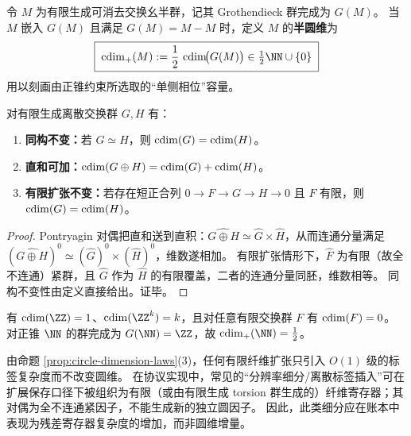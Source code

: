 \begin{definition}[半圆维]\label{def:half-circle-dimension}
令 \(M\) 为有限生成可消去交换幺半群，记其 Grothendieck 群完成为 \(G(M)\)。
当 \(M\) 嵌入 \(G(M)\) 且满足 \(G(M)=M-M\) 时，定义 \(M\) 的\textbf{半圆维}为
\[
\boxed{\;\cdim_{+}(M):=\frac12\,\cdim\!\bigl(G(M)\bigr)\in\tfrac12\NN\cup\{0\}\;}
\]
用以刻画由正锥约束所选取的“单侧相位”容量。
\end{definition}

\begin{proposition}[圆维的基本算律]\label{prop:circle-dimension-laws}
对有限生成离散交换群 \(G,H\) 有：
\begin{enumerate}
  \item \textbf{同构不变：}若 \(G\simeq H\)，则 \(\operatorname{cdim}(G)=\operatorname{cdim}(H)\)。
  \item \textbf{直和可加：}\(\operatorname{cdim}(G\oplus H)=\operatorname{cdim}(G)+\operatorname{cdim}(H)\)。
  \item \textbf{有限扩张不变：}若存在短正合列 \(0\to F\to G\to H\to 0\) 且 \(F\) 有限，则 \(\operatorname{cdim}(G)=\operatorname{cdim}(H)\)。
\end{enumerate}
\end{proposition}
\begin{proof}
Pontryagin 对偶把直和送到直积：\(\widehat{G\oplus H}\simeq \widehat G\times\widehat H\)，从而连通分量满足 \((\widehat{G\oplus H})^0\simeq (\widehat G)^0\times(\widehat H)^0\)，维数遂相加。
有限扩张情形下，\(\widehat F\) 为有限（故全不连通）紧群，且 \(\widehat G\) 作为 \(\widehat H\) 的有限覆盖，二者的连通分量同胚，维数相等。
同构不变性由定义直接给出。证毕。
\end{proof}

\begin{example}[基本例子]\label{ex:circle-dimension-examples}
有 \(\cdim(\ZZ)=1\)、\(\cdim(\ZZ^k)=k\)，且对任意有限交换群 \(F\) 有 \(\operatorname{cdim}(F)=0\)。
对正锥 \(\NN\) 的群完成为 \(G(\NN)=\ZZ\)，故 \(\cdim_{+}(\NN)=\tfrac12\)。
\end{example}

\begin{remark}[细分与纤维标签不增圆维]\label{rem:circle-dimension-refinement}
由命题 \ref{prop:circle-dimension-laws}(3)，任何有限纤维扩张只引入 \(O(1)\) 级的标签复杂度而不改变圆维。
在协议实现中，常见的“分辨率细分/离散标签插入”可在扩展保存口径下被组织为有限（或由有限生成 torsion 群生成的）纤维寄存器；其对偶为全不连通紧因子，不能生成新的独立圆因子。
因此，此类细分应在账本中表现为残差寄存器复杂度的增加，而非圆维增量。
\end{remark}







